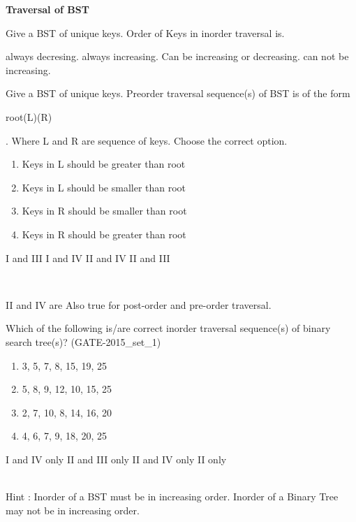

\centerline{\textbf{ \LARGE Traversal of BST}}

\begin{questyle}
  \question  Give a BST of unique keys. Order of Keys in inorder traversal is.
  \begin{choices}
    \choice         always decresing.
    \CorrectChoice  always increasing.
    \choice         Can be increasing or decreasing.
    \choice         can not be increasing.
  \end{choices}
\end{questyle}


\begin{questyle}
  \question  Give a BST of unique keys. Preorder traversal sequence(s) of BST is of the form
            \begin{hl} {root(L)(R)}\end{hl}. Where L and R are sequence of keys. Choose the correct option.
    \begin{enumerate}
        \item[I] Keys in L should be greater than root
        \item[II] Keys in L should be smaller than root
        \item[III] Keys in R should be smaller than root
        \item[IV] Keys in R should be greater than root
    \end{enumerate}

  \begin{oneparchoices}
    \choice         I and III
    \choice         I and IV
    \CorrectChoice  II and IV
    \choice         II and III
  \end{oneparchoices}
  \\ \begin{hl} {II and IV are Also true for post-order and pre-order traversal.} \end{hl}
\end{questyle}


\begin{questyle}
  \question  Which of the following is/are correct inorder traversal sequence(s) of binary search tree(s)?
            (GATE-2015\_set\_1)
    \begin{enumerate}
        \item[I] 3, 5, 7, 8, 15, 19, 25
        \item[II] 5, 8, 9, 12, 10, 15, 25
        \item[III] 2, 7, 10, 8, 14, 16, 20
        \item[IV] 4, 6, 7, 9, 18, 20, 25
    \end{enumerate}

  \begin{oneparchoices}
    \CorrectChoice  I and IV only
    \choice         II and III only
    \choice         II and IV only
    \choice         II only
  \end{oneparchoices} \\
  Hint : Inorder of a BST must be in increasing order. Inorder of a Binary Tree may not be in increasing order.
\end{questyle}


